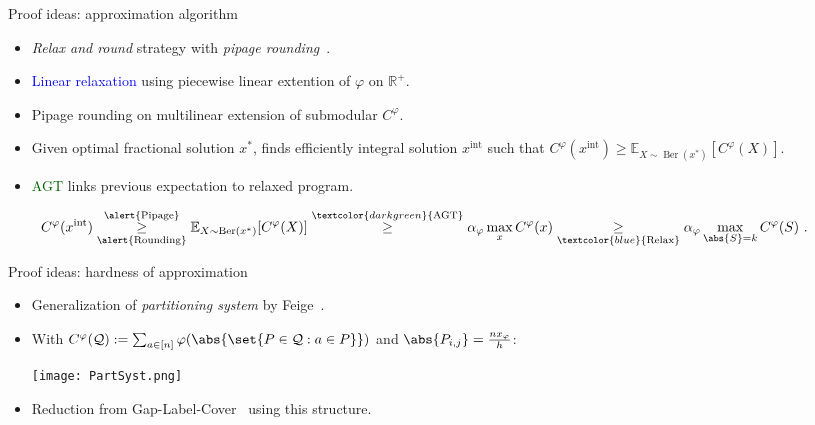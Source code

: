 \documentclass{beamer}
\theoremstyle{definition}
\theoremstyle{remark}
\DeclareMathOperator{\Ber}{\text{Ber}}
\begin{document}
\begin{frame}{Proof ideas: approximation algorithm}
  \begin{itemize}
  \item \emph{Relax and round} strategy with \emph{pipage rounding}~\cite{AS04, Vondrak07}.\pause
    \bigskip
  \item \textcolor{blue}{Linear relaxation} using piecewise linear extention of $\varphi$ on $\mathbb{R}^+$.
    \bigskip
  \item \alert{Pipage rounding} on multilinear extension of submodular $C^{\varphi}$.
  \item Given optimal fractional solution $x^*$, finds efficiently integral solution $x^{\text{int}}$ such that $C^{\varphi}(x^{\text{int}}) \geq \mathbb{E}_{X \sim \Ber(x^*)}[C^{\varphi}(X)]$.
    \bigskip

  \item \textcolor{darkgreen}{AGT} links previous expectation to relaxed program.
  \end{itemize}

  \pause
  \begin{align*}
    \hspace*{-0.7cm} C^{\varphi}(x^{\text{int}}) \underset{\alert{\text{Rounding}}}{\overset{\alert{\text{Pipage}}}{\geq}} \mathbb{E}_{X \sim \Ber(x^*)}[C^{\varphi}(X)]  \overset{\textcolor{darkgreen}{\text{AGT}}}{\geq} \alpha_{\varphi} \max_x  C^{\varphi}(x) \underset{\textcolor{blue}{\text{Relax}}}{\geq} \alpha_{\varphi} \max_{\abs{S} = k} C^{\varphi}(S)\ .
  \end{align*}
\end{frame}

\begin{frame}{Proof ideas: hardness of approximation}
  \begin{itemize}
  \item Generalization of \emph{partitioning system} by Feige~\cite{Feige98}.
    \bigskip
    \pause
  \item With $C^{\varphi}(\mathcal{Q}) := \sum_{a \in [n]} \varphi(\abs{\set{P \in \mathcal{Q} : a \in P}})$ and $\abs{P_{i,j}} = \frac{nx_{\varphi}}{h}$:
    \begin{center}
      \texttt{[image: PartSyst.png]}
    \end{center}
    \pause
    \item Reduction from Gap-Label-Cover~\cite{Feige98} using this structure.
  \end{itemize}
\end{frame}
\end{document}

